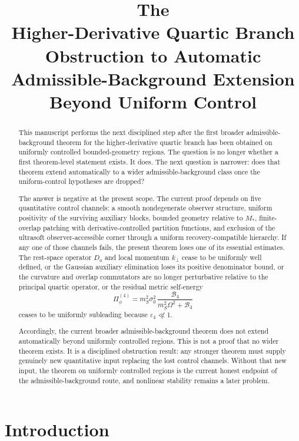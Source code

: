 \documentclass[11pt]{article}
\title{\textbf{The \TheoryName{}}\\[0.4em]
\large Higher-Derivative Quartic Branch Obstruction to Automatic Admissible-Background Extension Beyond Uniform Control}
\author{}
\date{}
\begin{document}
\maketitle

\begin{abstract}
This manuscript performs the next disciplined step after the first broader admissible-background theorem for the higher-derivative quartic branch has been obtained on uniformly controlled bounded-geometry regions. The question is no longer whether a first theorem-level statement exists. It does. The next question is narrower: does that theorem extend automatically to a wider admissible-background class once the uniform-control hypotheses are dropped?

The answer is negative at the present scope. The current proof depends on five quantitative control channels: a smooth nondegenerate observer structure, uniform positivity of the surviving auxiliary blocks, bounded geometry relative to \(M_*\), finite-overlap patching with derivative-controlled partition functions, and exclusion of the ultrasoft observer-accessible corner through a uniform recovery-compatible hierarchy. If any one of those channels fails, the present theorem loses one of its essential estimates. The rest-space operator \(D_a\) and local momentum \(k_\perp\) cease to be uniformly well defined, or the Gaussian auxiliary elimination loses its positive denominator bound, or the curvature and overlap commutators are no longer perturbative relative to the principal quartic operator, or the residual metric self-energy
\[
\Pi_\phi^{(4)}
=
m_S^2\sigma_0^2\,
\frac{\mathcal B_4}{m_S^2\Omega^2+\mathcal B_4}
\]
ceases to be uniformly subleading because \(\varepsilon_4\not\ll1\).

Accordingly, the current broader admissible-background theorem does not extend automatically beyond uniformly controlled regions. This is not a proof that no wider theorem exists. It is a disciplined obstruction result: any stronger theorem must supply genuinely new quantitative input replacing the lost control channels. Without that new input, the theorem on uniformly controlled regions is the current honest endpoint of the admissible-background route, and nonlinear stability remains a later problem.
\end{abstract}

\section{Introduction}
\end{document}
